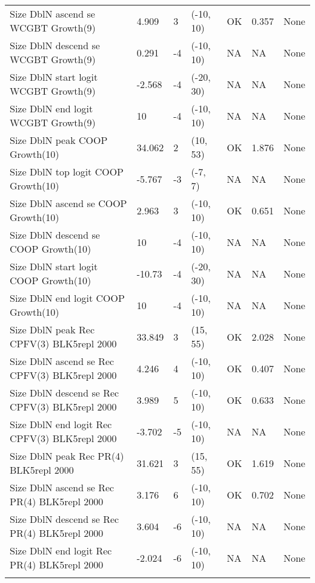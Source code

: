 \documentclass[11pt,
  english,
  letterpaper,
]{article}
\begin{document}
\begin{landscape}
\begin{longtable}[t]{>{\raggedright\arraybackslash}p{7.5cm}lllll>{\raggedright\arraybackslash}p{3.5cm}}
Size DblN ascend se WCGBT Growth(9) & 4.909 & 3 & (-10, 10) & OK & 0.357 & None\\
Size DblN descend se WCGBT Growth(9) & 0.291 & -4 & (-10, 10) & NA & NA & None\\
Size DblN start logit WCGBT Growth(9) & -2.568 & -4 & (-20, 30) & NA & NA & None\\
Size DblN end logit WCGBT Growth(9) & 10 & -4 & (-10, 10) & NA & NA & None\\
Size DblN peak COOP Growth(10) & 34.062 & 2 & (10, 53) & OK & 1.876 & None\\
Size DblN top logit COOP Growth(10) & -5.767 & -3 & (-7, 7) & NA & NA & None\\
Size DblN ascend se COOP Growth(10) & 2.963 & 3 & (-10, 10) & OK & 0.651 & None\\
Size DblN descend se COOP Growth(10) & 10 & -4 & (-10, 10) & NA & NA & None\\
Size DblN start logit COOP Growth(10) & -10.73 & -4 & (-20, 30) & NA & NA & None\\
Size DblN end logit COOP Growth(10) & 10 & -4 & (-10, 10) & NA & NA & None\\
Size DblN peak Rec CPFV(3) BLK5repl 2000 & 33.849 & 3 & (15, 55) & OK & 2.028 & None\\
Size DblN ascend se Rec CPFV(3) BLK5repl 2000 & 4.246 & 4 & (-10, 10) & OK & 0.407 & None\\
Size DblN descend se Rec CPFV(3) BLK5repl 2000 & 3.989 & 5 & (-10, 10) & OK & 0.633 & None\\
Size DblN end logit Rec CPFV(3) BLK5repl 2000 & -3.702 & -5 & (-10, 10) & NA & NA & None\\
Size DblN peak Rec PR(4) BLK5repl 2000 & 31.621 & 3 & (15, 55) & OK & 1.619 & None\\
Size DblN ascend se Rec PR(4) BLK5repl 2000 & 3.176 & 6 & (-10, 10) & OK & 0.702 & None\\
Size DblN descend se Rec PR(4) BLK5repl 2000 & 3.604 & -6 & (-10, 10) & NA & NA & None\\
Size DblN end logit Rec PR(4) BLK5repl 2000 & -2.024 & -6 & (-10, 10) & NA & NA & None\\*
\end{longtable}
\endgroup{}
\end{landscape}
\endgroup{}

\newpage



\newpage

\begingroup\fontsize{10}{12}\selectfont
\begingroup\fontsize{10}{12}\selectfont
\end{document}
